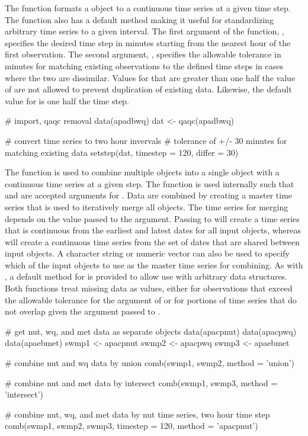 The  function formats a  object to a continuous time series at a given time step.  The function also has a default method making it useful for standardizing arbitrary time series to a given interval.  The first argument of the function, , specifies the desired time step in minutes starting from the nearest hour of the first observation.  The second argument, , specifies the allowable tolerance in minutes for matching existing observations to the defined time steps in cases where the two are dissimilar.  Values for  that are greater than one half the value of  are not allowed to prevent duplication of existing data.  Likewise, the default value for  is one half the time step.

\begin{example}
# import, qaqc removal
data(apadbwq)
dat <- qaqc(apadbwq)

# convert time series to two hour invervals
# tolerance of +/- 30 minutes for matching existing data
setstep(dat, timestep = 120, differ = 30)
\end{example}

The  function is used to combine multiple  objects into a single object with a continuous time series at a given step.  The  function is used internally such that  and  are accepted arguments for .  Data are combined by creating a master time series that is used to iteratively merge all  objects.  The time series for merging depends on the value passed to the  argument.  Passing  to  will create a time series that is continuous from the earliest and latest dates for all input objects, whereas  will create a continuous time series from the set of dates that are shared between input objects.  A character string or numeric vector can also be used to specify which of the input objects to use as the master time series for combining.  As with , a default method for  is provided to allow use with arbitrary data structures.  Both functions treat missing data as  values, either for observations that exceed the allowable tolerance for the  argument of  or for portions of time series that do not overlap given the  argument passed to .   

\begin{example}
# get nut, wq, and met data as separate objects
data(apacpnut)
data(apacpwq)
data(apaebmet)
swmp1 <- apacpnut
swmp2 <- apacpwq
swmp3 <- apaebmet

# combine nut and wq data by union
comb(swmp1, swmp2, method = 'union')

# combine nut and met data by intersect
comb(swmp1, swmp3, method = 'intersect')

# combine nut, wq, and met data by nut time series, two hour time step
comb(swmp1, swmp2, swmp3, timestep = 120, method = 'apacpnut')
\end{example}

